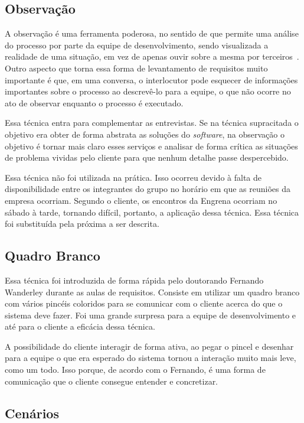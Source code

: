 \subsection{Observação}

A observação é uma ferramenta poderosa, no sentido de que permite uma análise do processo por parte da equipe de desenvolvimento, sendo visualizada a realidade de uma situação, em vez de apenas ouvir sobre a mesma por terceiros~\cite{dennis}. Outro aspecto que torna essa forma de levantamento de requisitos muito importante é que, em uma conversa, o interlocutor pode esquecer de informações importantes sobre o processo ao descrevê-lo para a equipe, o que não ocorre no ato de observar enquanto o processo é executado.

Essa técnica entra para complementar as entrevistas. Se na técnica supracitada o objetivo era obter de forma abstrata as soluções do \textit{software}, na observação o objetivo é tornar mais claro esses serviços e analisar de forma crítica as situações de problema vividas pelo cliente para que nenhum detalhe passe despercebido.

Essa técnica não foi utilizada na prática. Isso ocorreu devido à falta de disponibilidade entre os integrantes do grupo no horário em que as reuniões da empresa ocorriam. Segundo o cliente, os encontros da Engrena ocorriam no sábado à tarde, tornando difícil, portanto, a aplicação dessa técnica. Essa técnica foi substituída pela próxima a ser descrita.

\subsection{Quadro Branco}

Essa técnica foi introduzida de forma rápida pelo doutorando Fernando Wanderley durante as aulas de requisitos. Consiste em utilizar um quadro branco com vários pincéis coloridos para se comunicar com o cliente acerca do que o sistema deve fazer. Foi uma grande surpresa para a equipe de desenvolvimento e até para o cliente a eficácia dessa técnica.

A possibilidade do cliente interagir de forma ativa, ao pegar o pincel e desenhar para a equipe o que era esperado do sistema tornou a interação muito mais leve, como um todo. Isso porque, de acordo com o Fernando, é uma forma de comunicação que o cliente consegue entender e concretizar.

\subsection{Cenários}

